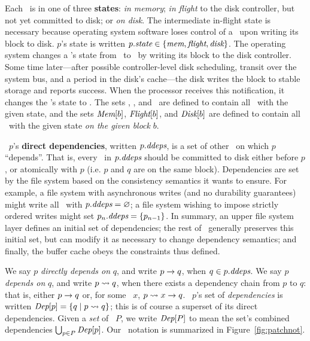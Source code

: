 Each \patch\ is in one of three \textbf{states}: \emph{in memory}; \emph{in
 flight} to the disk controller, but not yet committed to disk; or
 \emph{on disk}.  The intermediate in-flight state is necessary because
 operating system software loses control of a \patch\ upon writing its block
 to disk.  $p$'s state is written $p.\textit{state} \in \{\textit{mem}, \textit{flight},
 \textit{disk}\}$.  The operating system changes a \patch's state from
 \PMemst\ to \PInfst\ by writing its block to the disk controller.  Some
 time later---after possible controller-level disk scheduling, transit over
 the system bus, and a period in the disk's cache---the disk writes the block
 to stable storage and reports success.  When the processor receives this
 notification, it changes the \patch's state to \PDiskst.
%
The sets \PMem, \PInf, and \PDisk\ are defined to contain all \patches\ with
 the given state, and the sets $\PMem[b]$, $\PInf[b]$, and $\PDisk[b]$ are
 defined to contain all \patches\ with the given state \emph{on the given
 block} $b$.

\Patch\ $p$'s \textbf{direct dependencies}, written $\PDDepset{p}$, is a set of
 other \patches\ on which $p$ ``depends''.
%
That is, every \patch\ in $\PDDepset{p}$ should be committed to disk either
 before $p$, or atomically with $p$ (i.e. $p$ and $q$ are on the same block).
%
Dependencies are set by the file system based on the consistency
 semantics it wants to ensure.
%
For example, a file system with asynchronous writes (and no durability
 guarantees) might write all \patches\ with $\PDDepset{p} = \emptyset$;
%
a file system wishing to impose strictly ordered writes might set
 $\PDDepset{p_n} = \{p_{n-1}\}$.
%
In summary, an upper file system layer defines an initial set of
 dependencies;
%
the rest of \Kudos\ generally preserves this initial set, but can modify
 it as necessary to change dependency semantics;
%
and finally, the buffer cache obeys the constraints thus defined.


We say $p$ \emph{directly depends on} $q$, and write $p \rightarrow q$, when
 $q \in \PDDepset{p}$.
%
We say $p$ \emph{depends on} $q$, and write $p \leadsto q$, when there
 exists a dependency chain from $p$ to $q$: that is, either $p \rightarrow q$
 or, for some \patch\ $x$, $p \leadsto x \rightarrow q$.
%
\Patch\ $p$'s set of \emph{dependencies} is written $\textit{Dep}[p] = \{ q \mid
 p \leadsto q \}$; this is of course a superset of its direct dependencies.
%
Given a \emph{set} of \patches\ $P$, we write $\textit{Dep}[P]$ to mean the set's
 combined dependencies $\bigcup_{p\in P} \textit{Dep}[p]$. Our \patch\ notation
 is summarized in Figure~\ref{fig:patchnot}.



